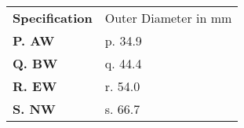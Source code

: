 \begin{tabular}{>{\bfseries}l l}
Specification & Outer Diameter in mm \\
P. AW & p. 34.9 \\
Q. BW & q. 44.4 \\
R. EW & r. 54.0 \\
S. NW & s. 66.7 \\
\end{tabular}


